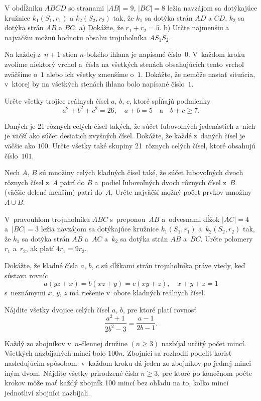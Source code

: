 {%
V obdĺžniku $ABCD$ so stranami $|AB|=9$, $|BC|=8$ ležia navzájom sa dotýkajúce kružnice $k_1(S_1,r_1)$ a $k_2(S_2,r_2)$ tak, že $k_1$ sa dotýka strán $AD$ a $CD$, $k_2$ sa dotýka strán $AB$ a $BC$.
\ite a) Dokážte, že $r_1+r_2=5$.
\ite b) Určte najmenšiu a najväčšiu možnú hodnotu obsahu trojuholníka $AS_1S_2$.\endgraf}

{%
Na každej z~$n+1$ stien $n$-bokého ihlana je napísané číslo~$0$. V~každom kroku zvolíme niektorý vrchol a~čísla na
všetkých stenách obsahujúcich tento vrchol zväčšíme o~$1$ alebo ich všetky zmenšíme o~$1$. Dokážte, že nemôže nastať situácia,
v~ktorej by na všetkých stenách ihlana bolo napísané číslo~$1$.}

{%
Určte všetky trojice reálnych čísel $a$, $b$, $c$, ktoré spĺňajú podmienky
$$
a^2+b^2+c^2=26,\quad a+b=5\quad\text{a}\quad b+c\ge7.
$$
}

{%
Daných je 21 rôznych celých čísel takých, že súčet ľubovoľných jedenástich
z~nich je väčší ako súčet desiatich zvyšných čísel.
 Dokážte, že každé z~daných čísel je väčšie ako $100$.
 Určte všetky také skupiny 21~rôznych celých čísel,
ktoré obsahujú číslo~$101$.}

{%
Nech $A$, $B$ sú množiny celých kladných čísel také, že súčet
ľubovoľných dvoch rôznych čísel z~$A$
patrí do $B$ a~podiel ľubovoľných dvoch rôznych čísel z~$B$ (väčšie delené menším)
patrí do~$A$.
Určte najväčší možný počet prvkov množiny $A\cup B$.}

{%
V~pravouhlom trojuholníku $ABC$ s~preponou~$AB$ a~odvesnami dĺžok
$|AC|=4$ a~$|BC|=3$ ležia navzájom sa dotýkajúce kružnice
$k_1(S_1,r_1)$ a~$k_2(S_2,r_2)$ tak, že $k_1$ sa dotýka strán $AB$ a~$AC$
a~$k_2$ sa dotýka strán $AB$ a~$BC$. Určte polomery $r_1$ a~$r_2$, ak platí
$4r_1=9r_2$.}

{%
Dokážte, že kladné čísla $a$, $b$, $c$ sú dĺžkami strán
trojuholníka práve vtedy, keď sústava rovníc
$$
a(yz+x)=b(xz+y)=c(xy+z),\quad x+y+z=1
$$
s~neznámymi $x$, $y$, $z$ má riešenie v~obore kladných reálnych čísel.}

{%
Nájdite všetky dvojice celých čísel $a$, $b$, pre ktoré platí rovnosť
$$
\frac{a^2+1}{2b^2-3}=\frac{a-1}{2b-1}.
$$
}

{%
Každý zo zbojníkov v~$n$-člennej družine $(n\ge3)$ nazbíjal určitý počet mincí. Všetkých nazbíjaných mincí bolo $100n$. Zbojníci sa rozhodli podeliť korisť nasledujúcim spôsobom: v~každom kroku dá jeden zo zbojníkov po jednej minci iným dvom. Nájdite všetky prirodzené čísla $n\ge3$, pre ktoré po konečnom počte krokov môže mať každý zbojník 100 mincí bez ohľadu na to, koľko mincí jednotliví zbojníci nazbíjali.}

